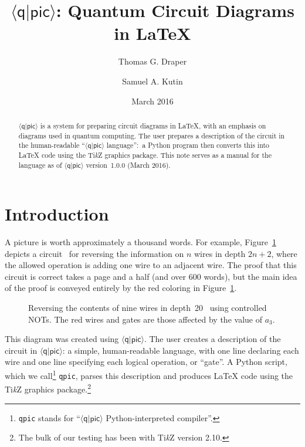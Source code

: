 \documentclass[twoside,12pt]{article}
\title{$\langle\mathsf{q}|\mathsf{pic}\rangle$: Quantum Circuit Diagrams in \LaTeX}
\author{Thomas G. Draper \and Samuel A. Kutin}
\date{March 2016}
\newcommand{\qpic}{$\langle\mathsf{q}|\mathsf{pic}\rangle$\xspace}
\newcommand{\qpicpy}{{\tt qpic}\xspace}
\newcommand{\TikZ}{Ti\emph{k}Z\xspace}
\begin{document}
\maketitle
\begin{abstract} 
{$\langle\mathsf{q}|\mathsf{pic}\rangle$\xspace} is a system
for preparing circuit diagrams in \LaTeX, with an emphasis on diagrams
used in quantum computing.  The user prepares a description of the
circuit in the human-readable
``{$\langle\mathsf{q}|\mathsf{pic}\rangle$\xspace} language'':\ a
Python program then converts this into {\LaTeX} code using the
{Ti\emph{k}Z\xspace} graphics package.  This note serves as a manual
for the language as of
{$\langle\mathsf{q}|\mathsf{pic}\rangle$\xspace} version~1.0.0
(March 2016).
\end{abstract}

\tableofcontents
\newpage

\section{Introduction}

A picture is worth approximately a thousand words.  For example, Figure~\ref{fig-rev} depicts a
circuit~\cite{kutin-moulton-smithline} for reversing the information on $n$ wires in depth $2n+2$,
where the allowed operation is adding one wire to an adjacent wire.  The proof that this circuit
is correct takes a page and a half (and over 600 words), but the main idea of the proof is conveyed
entirely by the red coloring in Figure~\ref{fig-rev}.

\begin{figure}[h!]
\begin{center}

\end{center}
\caption{Reversing the contents of nine wires in depth~20~\cite{kutin-moulton-smithline} using controlled NOTs.  The red wires and gates are those affected by the value of $a_3$.}
\label{fig-rev}
\end{figure}


This diagram was created using \qpic.  The user creates a description of the
circuit in \qpic: a simple, human-readable language, with one line declaring each wire and one line specifying each
logical operation, or ``gate''.  A Python script, which we
call\footnote{\qpicpy stands for ``\qpic Python-interpreted compiler''.}
\qpicpy, parses this description
and produces {\LaTeX} code using the \TikZ graphics package.\footnote{The bulk of our testing has been with \TikZ version 2.10.}
\end{document}
